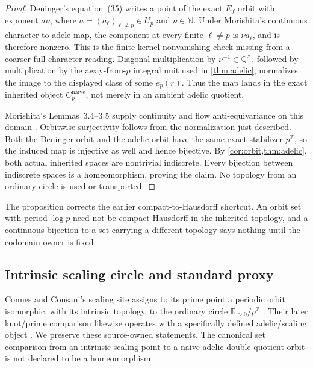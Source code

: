 \documentclass[11pt]{article}
\theoremstyle{definition}
\newcommand{\Q}{\mathbb{Q}}
\newcommand{\R}{\mathbb{R}}
\newcommand{\Z}{\mathbb{Z}}
\begin{document}
\begin{proof}
Deninger's equation~(35) writes a point of the exact \(E_f\) orbit with exponent \(a\nu\), where \(a=(a_\ell)_{\ell\ne p}\in U_p\) and \(\nu\in\mathbb N\).  Under Morishita's continuous character-to-adele map, the component at every finite \(\ell\ne p\) is \(\nu a_\ell\), and is therefore nonzero.  This is the finite-kernel nonvanishing check missing from a coarser full-character reading.  Diagonal multiplication by \(\nu^{-1}\in\Q^\times\), followed by multiplication by the away-from-\(p\) integral unit used in \cref{thm:adelic}, normalizes the image to the displayed class of some \(e_p(r)\).  Thus the map lands in the exact inherited object \(C_p^{\mathrm{naive}}\), not merely in an ambient adelic quotient.

Morishita's Lemmas~3.4--3.5 supply continuity and flow anti-equivariance on this domain \cite[physical pp.~23--24]{Morishita2026}.  Orbitwise surjectivity follows from the normalization just described.  Both the Deninger orbit and the adelic orbit have the same exact stabilizer \(p^{\Z}\), so the induced map is injective as well and hence bijective.  By \cref{cor:orbit,thm:adelic}, both actual inherited spaces are nontrivial indiscrete.  Every bijection between indiscrete spaces is a homeomorphism, proving the claim.  No topology from an ordinary circle is used or transported.
\end{proof}

The proposition corrects the earlier compact-to-Hausdorff shortcut.  An orbit set with period \(\log p\) need not be compact Hausdorff in the inherited topology, and a continuous bijection to a set carrying a different topology says nothing until the codomain owner is fixed.

\subsection{Intrinsic scaling circle and standard proxy}

Connes and Consani's scaling site assigns to its prime point a periodic orbit isomorphic, with its intrinsic topology, to the ordinary circle \(\R_{>0}/p^{\Z}\) \cite[Lemma~6.3(i), physical p.~5]{ConnesConsani2016}.  Their later knot/prime comparison likewise operates with a specifically defined adelic/scaling object \cite[physical p.~9 and Proposition~3.4, pp.~11--12]{ConnesConsani2026}.  We preserve these source-owned statements.  The canonical set comparison from an intrinsic scaling point to a naive adelic double-quotient orbit is not declared to be a homeomorphism.
\end{document}
